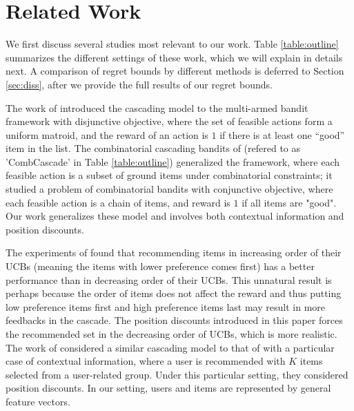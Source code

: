 \documentclass{article}
\newcommand{\shuai}[1]{{\color{brown!60!black} [\text{Shuai:} #1]}}
\begin{document}


\section{Related Work}

We first discuss several studies most relevant to our work.
Table \ref{table:outline} summarizes the different settings of these work, 
	which we will explain in details next.
A comparison of regret bounds by different methods is deferred to Section \ref{sec:diss},
	after we provide the full results of our regret bounds.

The work of \cite{kveton2015cascading} introduced the cascading model to the multi-armed bandit framework with disjunctive objective, where the set of feasible actions form a uniform matroid, and the reward of an action is $1$ if there is at least one ``good'' item in the list. 
The combinatorial cascading bandits of \cite{kveton2015combinatorial} (refered to as 'CombCascade' in Table \ref{table:outline}) generalized the framework, where each feasible action is a subset of ground items under combinatorial constraints; it studied a problem of combinatorial bandits with conjunctive objective, where each feasible action is a chain of items, and reward is $1$ if all items are "good". 
Our work generalizes these model and involves both contextual information and position discounts.

The experiments of \cite{kveton2015cascading} found that recommending items in increasing order of their UCBs (meaning the items with lower preference comes first) has a better performance than in decreasing order of their UCBs.
This unnatural result is perhaps because the order of items does not affect the reward and thus
	putting low preference items first and high preference items last may result in more feedbacks
	in the cascade.
The position discounts introduced in this paper forces the recommended set in the decreasing order 
	of UCBs, which is more realistic.
The work of \cite{combes2015learning} considered a similar cascading model to that of \cite{kveton2015cascading} with a particular case of contextual information, where a user is recommended with $K$ items selected from a user-related group. Under this particular setting, they considered position discounts.
In our setting, users and items are represented by general feature vectors.
\end{document}

